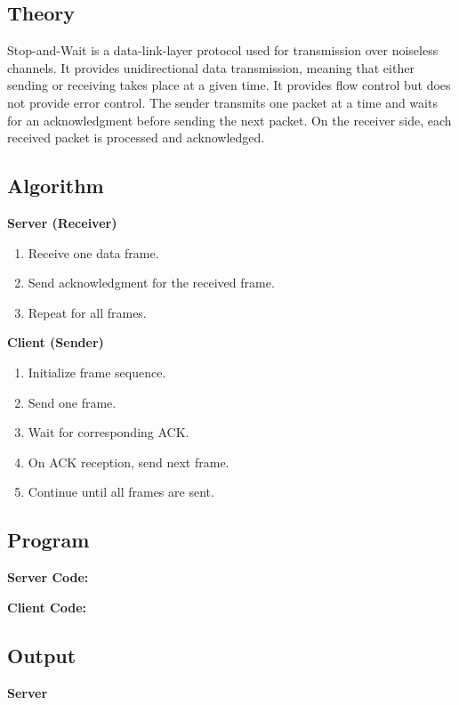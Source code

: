 \documentclass{article}
\begin{document}
\subsection{Theory}
Stop-and-Wait is a data-link-layer protocol used for transmission over noiseless channels. It provides unidirectional data transmission, meaning that either sending or receiving takes place at a given time. It provides flow control but does not provide error control.
The sender transmits one packet at a time and waits for an acknowledgment before sending the next packet. On the receiver side, each received packet is processed and acknowledged.

\subsection{Algorithm}
\noindent\textbf{Server (Receiver)}
\begin{enumerate}
    \item Receive one data frame.
    \item Send acknowledgment for the received frame.
    \item Repeat for all frames.
\end{enumerate}

\noindent\textbf{Client (Sender)}
\begin{enumerate}
    \item Initialize frame sequence.
    \item Send one frame.
    \item Wait for corresponding ACK.
    \item On ACK reception, send next frame.
    \item Continue until all frames are sent.
\end{enumerate}

\subsection{Program}
\noindent\textbf{Server Code:}


\noindent\textbf{Client Code:}


\subsection{Output}
\noindent\textbf{\hspace{0.5cm}Server}
\vspace*{0.5cm}
\end{document}
